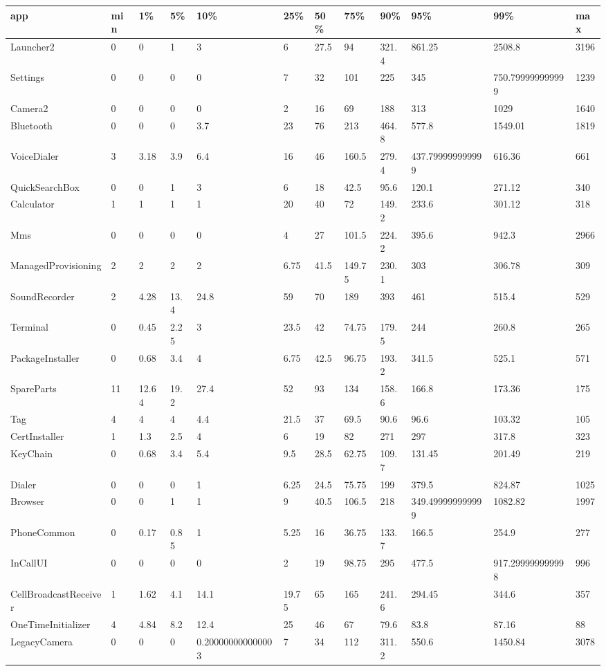 \documentclass[a4paper]{article}
\begin{document}
\begin{tabular}{|l|l|l|l|l|l|l|l|l|l|l|l|}
\hline
app&min&1\%&5\%&10\%&25\%&50\%&75\%&90\%&95\%&99\%&max\\
\hline
Launcher2&0&0&1&3&6&27.5&94&321.4&861.25&2508.8&3196\\
\hline
Settings&0&0&0&0&7&32&101&225&345&750.799999999999&1239\\
\hline
Camera2&0&0&0&0&2&16&69&188&313&1029&1640\\
\hline
Bluetooth&0&0&0&3.7&23&76&213&464.8&577.8&1549.01&1819\\
\hline
VoiceDialer&3&3.18&3.9&6.4&16&46&160.5&279.4&437.799999999999&616.36&661\\
\hline
QuickSearchBox&0&0&1&3&6&18&42.5&95.6&120.1&271.12&340\\
\hline
Calculator&1&1&1&1&20&40&72&149.2&233.6&301.12&318\\
\hline
Mms&0&0&0&0&4&27&101.5&224.2&395.6&942.3&2966\\
\hline
ManagedProvisioning&2&2&2&2&6.75&41.5&149.75&230.1&303&306.78&309\\
\hline
SoundRecorder&2&4.28&13.4&24.8&59&70&189&393&461&515.4&529\\
\hline
Terminal&0&0.45&2.25&3&23.5&42&74.75&179.5&244&260.8&265\\
\hline
PackageInstaller&0&0.68&3.4&4&6.75&42.5&96.75&193.2&341.5&525.1&571\\
\hline
SpareParts&11&12.64&19.2&27.4&52&93&134&158.6&166.8&173.36&175\\
\hline
Tag&4&4&4&4.4&21.5&37&69.5&90.6&96.6&103.32&105\\
\hline
CertInstaller&1&1.3&2.5&4&6&19&82&271&297&317.8&323\\
\hline
KeyChain&0&0.68&3.4&5.4&9.5&28.5&62.75&109.7&131.45&201.49&219\\
\hline
Dialer&0&0&0&1&6.25&24.5&75.75&199&379.5&824.87&1025\\
\hline
Browser&0&0&1&1&9&40.5&106.5&218&349.499999999999&1082.82&1997\\
\hline
PhoneCommon&0&0.17&0.85&1&5.25&16&36.75&133.7&166.5&254.9&277\\
\hline
InCallUI&0&0&0&0&2&19&98.75&295&477.5&917.299999999998&996\\
\hline
CellBroadcastReceiver&1&1.62&4.1&14.1&19.75&65&165&241.6&294.45&344.6&357\\
\hline
OneTimeInitializer&4&4.84&8.2&12.4&25&46&67&79.6&83.8&87.16&88\\
\hline
LegacyCamera&0&0&0&0.200000000000003&7&34&112&311.2&550.6&1450.84&3078\\

\end{tabular}
\end{document}
